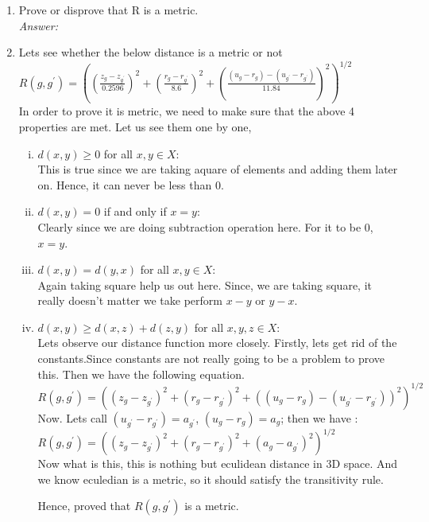 \documentclass{article}
\begin{document}
\begin{enumerate}[1.]
	\item Prove or disprove that R is a metric.\\
	\emph{Answer:}
		\item Lets  see whether the below distance is a metric or not\\
			$R(g,g^{'}) = \left((\frac{z_g - z_{g^{'}}}{0.2596})^2 + (\frac{r_g - r_{g^{'}}}{8.6})^2 + (\frac{(u_g - r_g) - (u_{g^{'}} - r_{g^{'}}) }{11.84})^2\right)^{1/2}$ \\
			In order to prove it is metric, we need to make sure that the above 4 properties are met. Let us see them one by one,\\
			\begin{enumerate}[(i)]
			\item $d(x, y) \ge 0$ for all $x, y \in X$: \\This is true since we are taking aquare of elements and adding them later on. Hence, it can never be less than 0.
			\item $d(x, y) = 0$ if and only if  $x = y$: \\Clearly since we are doing subtraction operation here. For it to be 0, $x=y$.
			\item $d(x, y) = d(y, x)$ for all $x, y \in X$: \\ Again taking square help us out here. Since, we are taking square, it really doesn't matter we take perform $x-y$ or $y-x$.
			\item $d(x, y) \ge d(x, z) + d(z, y)$ for all $x, y, z \in X$: \\ Lets observe our distance function more closely. Firstly, lets get rid of the constants.Since constants are not really going to be a problem to prove this.  Then we have the following equation. \\
			$R(g,g^{'}) = \left((z_g - z_{g^{'}})^2 + (r_g - r_{g^{'}})^2 + ((u_g - r_g) - (u_{g^{'}} -r_{g^{'}}))^2 \right)^{1/2}$ \\

Now. Lets call $(u_{g^{'}} -r_{g^{'}}) = a_{g^{'}}$, $(u_{g} -r_{g}) = a_{g}$; then we have :\\
			$R(g,g^{'}) = \left((z_g - z_{g^{'}})^2 + (r_g - r_{g^{'}})^2 + (a_g - a_{g^{'}})^2 \right)^{1/2}$ \\
Now what is this, this is nothing but eculidean distance in 3D space. And we know eculedian is a metric, so it should satisfy the transitivity rule.

Hence, proved that $R(g,g^{'})$ is a metric.


\end{enumerate}
\end{enumerate}
\end{document}
